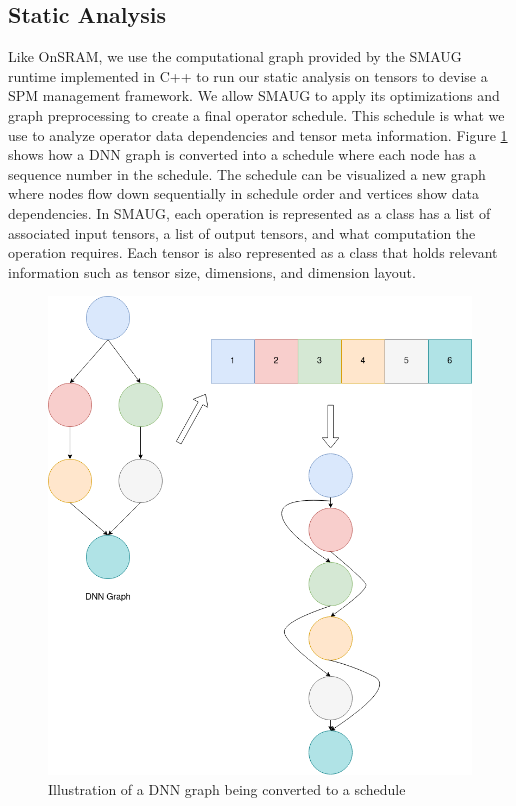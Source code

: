 

\subsection{Static Analysis}
Like OnSRAM, we use the computational graph provided by the SMAUG runtime
implemented in C++ to run our static analysis on tensors to devise a SPM
management framework. We allow SMAUG to apply its optimizations and graph
preprocessing to create a final operator schedule. This schedule is what we use
to analyze operator data dependencies and tensor meta information.  Figure
\ref{fig:graphToSchedule} shows how a DNN graph is converted into a schedule
where each node has a sequence number in the schedule. The schedule can be
visualized a new graph where nodes flow down sequentially in schedule order and
vertices show data dependencies. In SMAUG, each operation is represented as a
class has a list of associated input tensors, a list of output tensors, and
what computation the operation requires.  Each tensor is also represented as a
class that holds relevant information such as tensor size, dimensions, and
dimension layout.

\begin{figure}[thb!]
\centering
\includegraphics[scale=0.6]{Figures/graph_to_schedule.png}
\decoRule
\caption[graphToSchedule]{Illustration of a DNN graph being converted to a schedule}
\label{fig:graphToSchedule}
\end{figure}



